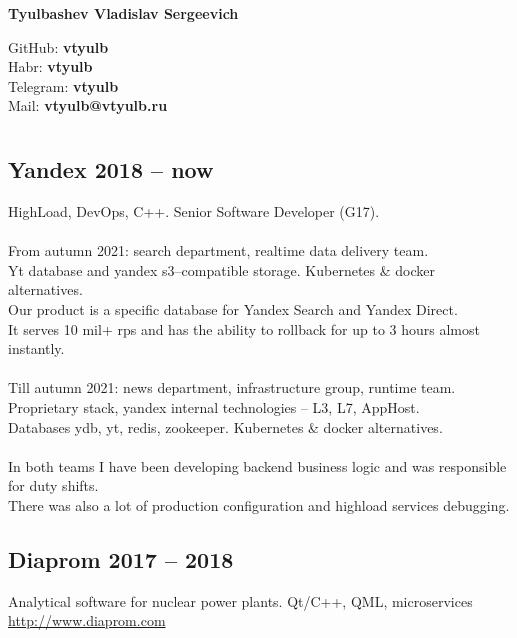 \documentclass[a4paper, 11pt]{article}
\begin{document}
\begin{center}
    \huge\textbf{Tyulbashev Vladislav Sergeevich}\\
\end{center}
\null\hfill GitHub: \textbf{vtyulb} \\
\null\hfill Habr: \textbf{vtyulb} \\
\null\hfill Telegram: \textbf{vtyulb} \\
\null\hfill Mail: \textbf{vtyulb@vtyulb.ru} \\

\section*{} {
    \subsection*{Yandex 2018 -- now} {
        HighLoad, DevOps, C++. Senior Software Developer (G17). \\
        \\
        From autumn 2021: search department, realtime data delivery team. \\
        Yt database and yandex s3--compatible storage. Kubernetes \& docker alternatives. \\
        Our product is a specific database for Yandex Search and Yandex Direct. \\
        It serves 10 mil+ rps and has the ability to rollback for up to 3 hours almost instantly. \\
        \\
        Till autumn 2021: news department, infrastructure group, runtime team. \\
        Proprietary stack, yandex internal technologies -- L3, L7, AppHost. \\
        Databases ydb, yt, redis, zookeeper. Kubernetes \& docker alternatives. \\
        \\
        In both teams I have been developing backend business logic and was responsible for duty shifts. \\
        There was also a lot of production configuration and highload services debugging.
    }
        
    \subsection*{Diaprom 2017 -- 2018} {
        Analytical software for nuclear power plants. Qt/C++, QML, microservices \\
        \href{http://www.diaprom.com/}{http://www.diaprom.com}
    }
    
}
\end{document}
